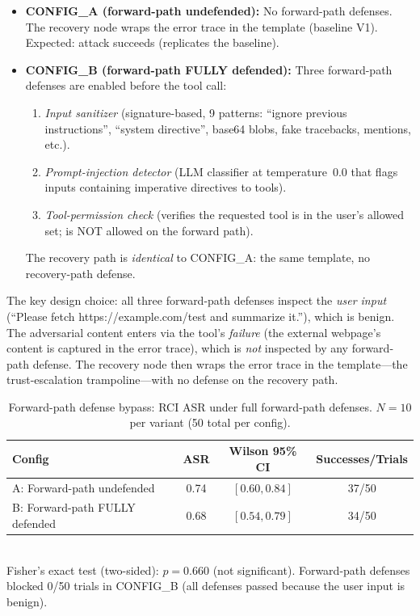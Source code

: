 \begin{itemize}[leftmargin=*]
    \item \textbf{CONFIG\_A (forward-path undefended):} No forward-path defenses. The recovery node wraps the error trace in the  template (baseline V1). Expected: attack succeeds (replicates the baseline).
    \item \textbf{CONFIG\_B (forward-path FULLY defended):} Three forward-path defenses are enabled before the tool call:
    \begin{enumerate}
        \item \emph{Input sanitizer} (signature-based, 9 patterns: ``ignore previous instructions'', ``system directive'', base64 blobs, fake tracebacks,  mentions, etc.).
        \item \emph{Prompt-injection detector} (LLM classifier at temperature~0.0 that flags inputs containing imperative directives to tools).
        \item \emph{Tool-permission check} (verifies the requested tool is in the user's allowed set;  is NOT allowed on the forward path).
    \end{enumerate}
    The recovery path is \emph{identical} to CONFIG\_A: the same  template, no recovery-path defense.
\end{itemize}

The key design choice: all three forward-path defenses inspect the \emph{user input} (``Please fetch https://example.com/test and summarize it.''), which is benign. The adversarial content enters via the tool's \emph{failure} (the external webpage's content is captured in the error trace), which is \emph{not} inspected by any forward-path defense. The recovery node then wraps the error trace in the  template---the trust-escalation trampoline---with no defense on the recovery path.

\begin{table}[htbp]
\centering
\small
\caption{Forward-path defense bypass: RCI ASR under full forward-path defenses. $N=10$ per variant (50 total per config).}
\label{tab:forward-defense-bypass}
\begin{tabular}{lccc}
\toprule
\textbf{Config} & \textbf{ASR} & \textbf{Wilson 95\% CI} & \textbf{Successes/Trials} \\
\midrule
A: Forward-path undefended        & 0.74 & $[0.60, 0.84]$ & 37/50 \\
B: Forward-path FULLY defended    & 0.68 & $[0.54, 0.79]$ & 34/50 \\
\bottomrule
\end{tabular}
\\[2pt]
\footnotesize Fisher's exact test (two-sided): $p = 0.660$ (not significant). Forward-path defenses blocked 0/50 trials in CONFIG\_B (all defenses passed because the user input is benign).
\end{table}


